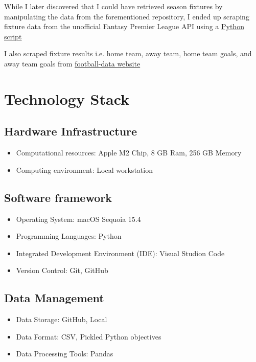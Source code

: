 While I later discovered that I could have retrieved season fixtures by manipulating the data from the forementioned repository, I ended up scraping fixture data from the unofficial Fantasy Premier League API using a \href{https://github.com/MUN3N3Z/FPL_AI/tree/main/scripts/save_season_fixtures.py}{\underline{Python script}}

I also scraped fixture results i.e. home team, away team, home team goals, and away team goals from \href{www.football-data.co.uk}{football-data website}

\section{Technology Stack}
\subsection{Hardware Infrastructure}

\begin{itemize}
    \item Computational resources: Apple M2 Chip, 8 GB Ram, 256 GB Memory
    \item Computing environment: Local workstation
\end{itemize}

\subsection{Software framework}
\begin{itemize}
    \item Operating System: macOS Sequoia 15.4
    \item Programming Languages: Python
    \item Integrated Development Environment (IDE): Visual Studion Code
    \item Version Control: Git, GitHub
\end{itemize}

\subsection{Data Management}
\begin{itemize}
    \item Data Storage: GitHub, Local
    \item Data Format: CSV, Pickled Python objectives
    \item Data Processing Tools: Pandas
\end{itemize}

